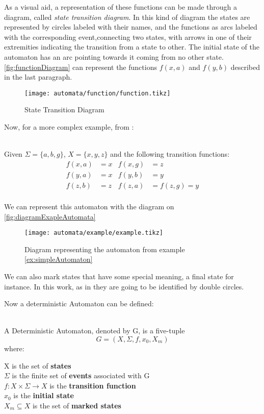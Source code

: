 As a
visual aid, a representation of these functions can be made through a diagram, called \emph{state transition diagram}. In this kind of diagram the states are
represented by circles labeled with their names, and the functions as arcs
labeled with the corresponding event,connecting two states, with arrows in one of their
extremities indicating the transition from a state to other. The initial state
of the automaton has an arc pointing towards it coming from no other state.
\autoref{fig:functionDiagram} can represent the functions $f(x,a)$ and $f(y,b)$
described in the last paragraph.
\begin{figure}[H]
  \centering
  \texttt{[image: automata/function/function.tikz]}
  \caption{State Transition Diagram}
  \label{fig:functionDiagram}
\end{figure}
Now, for a more complex example, from \cite{cassandras2009introduction}:

\begin{example} ~\\
  \label{ex:simpleAutomaton}
  Given $\Sigma = \{a,b,g\}$, $X = \{x,y,z\}$ and the following transition functions:
  \begin{align*}
   f(x,a)&=x&f(x,g)&=z\\
   f(y,a)&=x&f(y,b)&=y\\
   f(z,b)&=z&f(z,a)&=f(z,g)=y\\
 \end{align*}
\end{example}
We can represent this automaton with the diagram on \autoref{fig:diagramExapleAutomata}
\begin{figure}[H]
  \centering
  \texttt{[image: automata/example/example.tikz]}
  \caption{Diagram representing the automaton from example \ref{ex:simpleAutomaton}}
  \label{fig:diagramExapleAutomata}
\end{figure}
We can also mark states that have some special meaning, a final state for instance. In this work, as in \cite{cassandras2009introduction} they are
  going to be identified by double circles.

  
  Now a deterministic Automaton can be defined:
\begin{definition}
  \label{def:DeterministicAutomaton}~\\
  A Deterministic Automaton, denoted by G, is a five-tuple
  \[ G = (X,\Sigma,f, x_0,X_m)\] where:

  \indent X is the set of \textbf{states} \\
  \indent $\Sigma$ is the finite set of \textbf{events} associated with G\\
  \indent $f: X \times \Sigma \rightarrow X$ is the \textbf{transition function}  \\
  \indent $x_0$ is the \textbf{initial state} \\
  \indent $X_m \subseteq X $ is the set of \textbf{marked states}

\end{definition}


